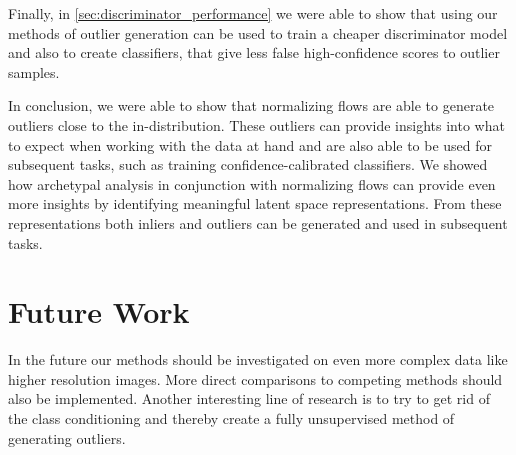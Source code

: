Finally, in \autoref{sec:discriminator_performance} we were able to show that
using our methods of outlier generation can be used to train a cheaper
discriminator model and also to create classifiers, that give less false
high-confidence scores to outlier samples.

In conclusion, we were able to show that normalizing flows are able to generate
outliers close to the in-distribution. These outliers can provide insights into
what to expect when working with the data at hand and are also able to be used
for subsequent tasks, such as training confidence-calibrated classifiers. We
showed how archetypal analysis in conjunction with normalizing flows can
provide even more insights by identifying meaningful latent space
representations. From these representations both inliers and outliers can be
generated and used in subsequent tasks.

\section{Future Work}%
\label{sec:future_work}

In the future our methods should be investigated on even more complex data like
higher resolution images. More direct comparisons to competing methods should
also be implemented. Another interesting line of research is to try to get rid
of the class conditioning and thereby create a fully unsupervised method of
generating outliers.



